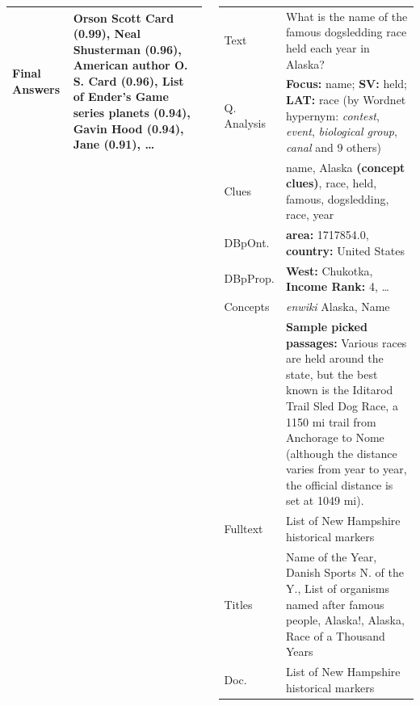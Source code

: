 \documentclass[xcolor=table]{beamer}
\begin{document}
\begin{frame}[fragile]{}
\begin{columns}[t]
\begin{columns}[t]
\begin{tabular}{|p{3.6cm}p{13cm}|}
Final Answers & \hspace{0pt}\alert{Orson Scott Card} (0.99), Neal Shusterman (0.96), American author O. S. Card (0.96), List of Ender's Game series planets (0.94), Gavin Hood (0.94), Jane (0.91), \dots \\ \hline
\end{tabular}


\centering
\footnotesize
\begin{tabular}{|p{3.6cm}p{13cm}|}
\hline
Text & \hspace{0pt}\alert{What is the name of the famous dogsledding race held each year in Alaska?} \\
Q. Analysis & \textbf{Focus:} name; \textbf{SV:} held; \textbf{LAT:} race
	(by Wordnet hypernym: \textit{contest}, \textit{event}, \textit{biological group}, \textit{canal} and 9 others) \\
Clues & name, Alaska \textbf{(concept clues)}, race, held, famous, dogsledding, race, year \\ \hline

DBpOnt. & \textbf{area:} 1717854.0, \textbf{country:} United States \\
DBpProp. & \textbf{West:} Chukotka, \textbf{Income Rank:} 4, \dots \\
Concepts & \textit{enwiki} Alaska, Name \\
	& \textbf{Sample picked passages:} Various races are held around the state, but the best known is the Iditarod Trail Sled Dog Race, a 1150 mi trail from Anchorage to Nome (although the distance varies from year to year, the official distance is set at 1049 mi). \\
Fulltext %
	& List of New Hampshire historical markers \\
Titles & Name of the Year, Danish Sports N. of the Y., List of organisms named after famous people, Alaska!, Alaska, Race of a Thousand Years \\
Doc. & List of New Hampshire historical markers \\ \hline


\end{tabular}
\end{columns}
\end{columns}
\end{frame}
\end{document}
